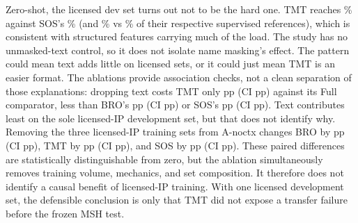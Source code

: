 Zero-shot, the licensed dev set turns out not to be the hard one. TMT
reaches \FdevTmt\% against SOS's \FdevSos\% (and \RatioTmt\% vs
\RatioSos\% of their respective supervised references), which is
consistent with structured features carrying much of the load. The study
has no unmasked-text control, so it does not isolate name masking's effect.
The pattern could mean text adds little on licensed sets, or it could just
mean TMT is an easier format. The ablations provide association checks,
not a clean separation of those explanations:
dropping text costs TMT only \TextPenTmt pp (CI \TextPenTmtCi pp) against
its Full comparator, less than BRO's \TextPenBro pp (CI \TextPenBroCi pp)
or SOS's \TextPenSos pp (CI \TextPenSosCi pp). Text contributes least on
the sole licensed-IP development set, but that does not identify why.
Removing the three licensed-IP training sets from A-noctx changes BRO by
\UbPenBro pp (CI \UbPenBroCi pp), TMT by \UbPenTmt pp (CI \UbPenTmtCi pp),
and SOS by \UbPenSos pp (CI \UbPenSosCi pp). These paired differences are
statistically distinguishable from zero, but the ablation simultaneously
removes training volume, mechanics, and set composition. It therefore does
not identify a causal benefit of licensed-IP training. With one licensed
development set, the defensible conclusion is only that TMT did not expose
a transfer failure before the frozen MSH test.

